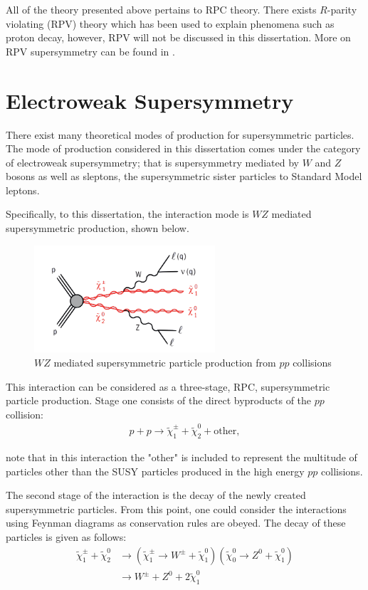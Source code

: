 All of the theory presented above pertains to RPC theory.
There exists $R$-parity violating (RPV) theory which has been used to explain phenomena such as proton decay, however, RPV will not be discussed in this dissertation.
More on RPV supersymmetry can be found in \cite{barbier2005r}.

\section{Electroweak Supersymmetry}
There exist many theoretical modes of production for supersymmetric particles.
The mode of production considered in this dissertation comes under the category of electroweak supersymmetry; that is supersymmetry mediated by $W$ and $Z$ bosons as well as sleptons, the supersymmetric sister particles to Standard Model leptons.

Specifically, to this dissertation, the interaction mode is $WZ$ mediated supersymmetric production, shown below.

\begin{figure}[H] %
   \centering
   \includegraphics[width=0.6\textwidth]{Pictures/SUSYProduction} 
   \caption{$WZ$ mediated supersymmetric particle production from $pp$ collisions}
   \label{fig:myProduction}
\end{figure}

This interaction can be considered as a three-stage, RPC, supersymmetric particle production.
Stage one consists of the direct byproducts of the $pp$ collision:
\begin{align}
p + p \rightarrow \tilde{\chi}^{\pm}_{1} + \tilde{\chi}^{0}_{2} + \textrm{other},
\end{align}

\noindent note that in this interaction the "other" is included to represent the multitude of particles other than the SUSY particles produced in the high energy $pp$ collisions.

The second stage of the interaction is the decay of the newly created supersymmetric particles.
From this point, one could consider the interactions using Feynman diagrams as conservation rules are obeyed.
The decay of these particles is given as follows:
\begin{align}
\tilde{\chi}^{\pm}_{1} + \tilde{\chi}^{0}_{2} &\rightarrow (\tilde{\chi}^{\pm}_{1} \rightarrow W^{\pm} + \tilde{\chi}^{0}_{1})(\tilde{\chi}^{0}_{0} \rightarrow Z^{0} + \tilde{\chi}^{0}_{1}) \\
&\rightarrow W^{\pm} + Z^{0} + 2 \tilde{\chi}^{0}_{1}
\end{align}

